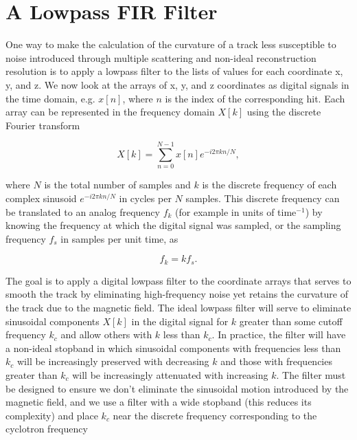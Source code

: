 \documentclass{JINST}
\begin{document}
\section{A Lowpass FIR Filter}\label{app:FIR}

One way to make the calculation of the curvature of a track less susceptible to noise 
introduced through multiple scattering and non-ideal reconstruction resolution is to apply a lowpass filter to 
the lists of values for each coordinate x, y, and z.  We now look at the arrays of x, y, and z coordinates as digital 
signals in the time domain, e.g. $x[n]$, where $n$ is the index of the corresponding hit.  Each array can be 
represented in the frequency domain $X[k]$ using the discrete Fourier transform

\begin{equation}
X[k] = \sum_{n=0}^{N-1}x[n]e^{-i2\pi kn/N},
\end{equation}

\noindent where $N$ is the total number of samples and $k$ is the discrete frequency of each complex
sinusoid $e^{-i2\pi kn/N}$ in cycles per $N$ samples.  This discrete frequency can be translated to an analog
frequency $f_{k}$ (for example in units of time$^{-1}$) by knowing the frequency at which the digital signal was
sampled, or the sampling frequency $f_{s}$ in samples per unit time, as

\begin{equation}
f_{k} = kf_{s}.
\end{equation}

The goal is to apply a digital lowpass filter to the coordinate arrays that serves to
smooth the track by eliminating high-frequency noise yet retains the curvature of the track
due to the magnetic field.  The ideal lowpass filter will serve to eliminate sinusoidal components
$X[k]$ in the digital signal for $k$ greater than some cutoff frequency $k_{c}$ and allow 
others with $k$ less than $k_{c}$.  In practice, the filter will have a non-ideal stopband in which sinusoidal 
components with frequencies less than $k_{c}$ will be increasingly preserved with decreasing $k$ and those 
with frequencies greater than $k_{c}$ will be increasingly attenuated with increasing $k$.  The filter must be 
designed to ensure we don't eliminate the sinusoidal motion introduced by the magnetic field, and we use a
filter with a wide stopband (this reduces its complexity) and place $k_{c}$ near the discrete frequency 
corresponding to the cyclotron frequency

\end{document}
